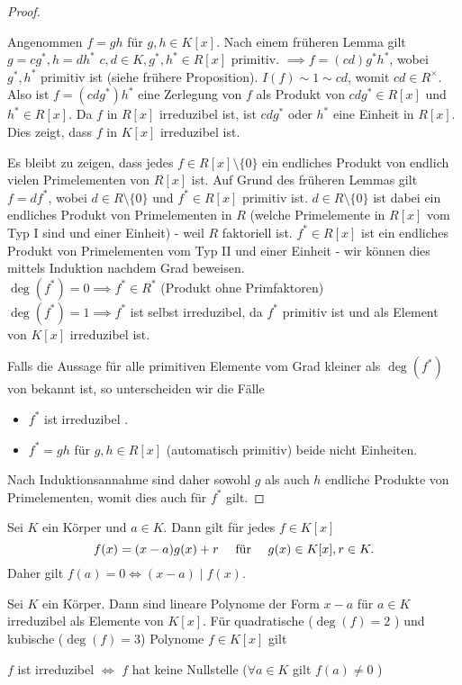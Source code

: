 \begin{proof}
\begin{itemize}
			Angenommen $f = gh$ für $g,h \in K[x]$.
			Nach einem früheren Lemma gilt $g = c g^{*}, h = d h^{*}$ $c,d \in K,g^{*}, h^{*} \in R[x]$ primitiv.
			$\implies f = (cd) g^{*} h^{*}$, wobei $g^{*}, h^{*}$ primitiv ist (siehe frühere Proposition).
			$I(f) \sim 1 \sim cd$, womit $cd \in R^{\times}$.
			Also ist $f = (cd g^{*}) h^{*}$ eine Zerlegung von $f$ als Produkt von $cd g^{*} \in R[x]$ und $h^{*} \in R[x]$.
			Da $f$ in $R[x]$ irreduzibel ist, ist $cdg^{*}$ oder $h^{*}$ eine Einheit in $R[x]$.
			Dies zeigt, dass $f$ in $K[x]$ irreduzibel ist.
	\end{itemize}
	Es bleibt zu zeigen, dass jedes $f \in R[x] \setminus \{0\} $ ein endliches Produkt von endlich vielen Primelementen von $R[x]$ ist.
	Auf Grund des früheren Lemmas gilt $f = df^{*}$, wobei $d \in R \setminus \{0\} $ und $f^{*} \in R[x]$ primitiv ist.
	$d \in R \setminus \{0\} $ ist dabei ein endliches Produkt von Primelementen in $R$ (welche Primelemente in $R[x]$ vom Typ I sind und einer Einheit) 
	- weil  $R$ faktoriell ist.
	$f^{*} \in R[x]$ ist ein endliches Produkt von Primelementen vom Typ II und einer Einheit - wir können dies mittels Induktion nachdem Grad beweisen.\\
	$\deg(f^{*}) = 0 \implies f^{*} \in R^{*}$ (Produkt ohne Primfaktoren)\\
	$\deg(f^{*}) = 1 \implies f^{*}$ ist selbst irreduzibel, da $f^{*}$ primitiv ist und als Element von $K[x]$ irreduzibel ist.
	
	Falls die Aussage für alle primitiven Elemente vom Grad kleiner als  $\deg(f^{*})$ von bekannt ist, so unterscheiden wir die Fälle
	\begin{itemize}
		\item $f^{*}$ ist irreduzibel \checkmark.
		\item $f^{*} = gh$ für $g,h \in R[x]$ (automatisch primitiv) beide nicht Einheiten.
	\end{itemize}
	Nach Induktionsannahme sind daher sowohl $g$ als auch $h$ endliche Produkte von Primelementen,
	womit dies auch für $f^{*}$ gilt.
\end{proof}

\begin{lemma}
	Sei $K$ ein Körper und $a \in K$. Dann gilt für jedes $f \in K[x]$ 
	\[
		f(x) = (x-a)g(x) + r \qq{ für } g(x) \in K[x], r \in K
	.\]
	Daher gilt $f(a) = 0 \Leftrightarrow (x-a) \mid f(x)$.
\end{lemma}

\begin{proposition}
	Sei $K$ ein Körper. Dann sind lineare Polynome der Form $x-a$ für $a \in K$ irreduzibel als Elemente von $K[x]$.
	Für quadratische ($\deg(f) = 2$ ) und kubische ($\deg(f) = 3$) Polynome  $f \in K[x]$ gilt
	\begin{center}
		$f$ ist irreduzibel $\Leftrightarrow$ $f$ hat keine Nullstelle ($\forall a \in K$ gilt $f(a) \neq 0$ )
	\end{center}
\end{proposition}

